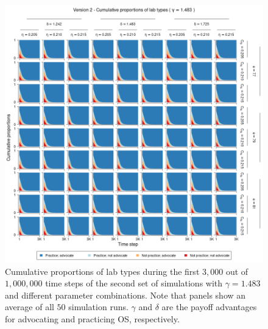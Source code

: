 \documentclass[meta, authordate,issue]{jote-new-article}
\begin{document}
\begin{figure}
  \begin{fullwidth}
    \centering
    \includegraphics[width=\textwidth]{v2_pro_plot_sens_payypro1.483.png}
    \caption{Cumulative proportions of lab types during the first $3,000$ out of $1,000,000$ time steps of the second set of simulations with $\gamma=1.483$ and different parameter combinations. Note that panels show an average of all $50$ simulation runs. $\gamma$ and $\delta$ are the payoff advantages for advocating and practicing OS, respectively.}
    \label{fig:v2_pro_plot_sens_payypro1.483}
  \end{fullwidth}
\end{figure}
%
%
\end{document}
